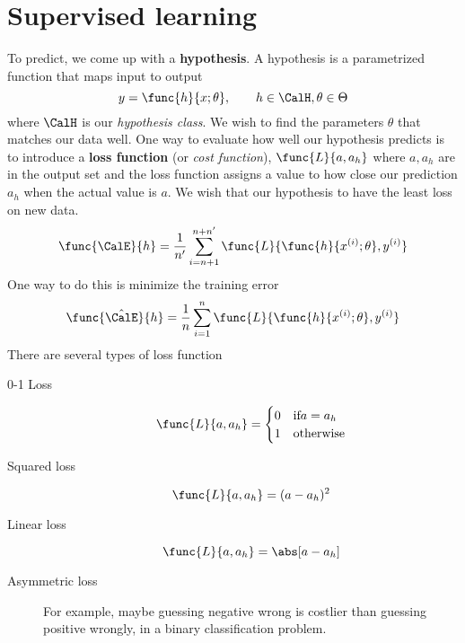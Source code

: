 \chapter{Supervised learning}
To predict, we come up with a \textbf{hypothesis}. A hypothesis is a parametrized function that maps input to output
\begin{equation*}
    y = \func{h}{x ; \theta} , \qquad h \in \CalH, \theta \in \Theta
\end{equation*}
where \(\CalH\) is our \textit{hypothesis class}. We wish to find the parameters \(\theta\) that matches our data well. One way to evaluate how well our hypothesis predicts is to introduce a \textbf{loss function} (or \textit{cost function}), \(\func{L}{a,a_h}\) where \(a,a_h\) are in the output set and the loss function assigns a value to how close our prediction \(a_h\) when the actual value is \(a\). We wish that our hypothesis to have the least loss on new data.
\begin{equation*}
    \func{\CalE}{h} = \dfrac{1}{n'} \sum_{i = n + 1}^{n + n'} \func{L}{\func{h}{x^{(i)} ; \theta }, y^{(i)}}
\end{equation*}
One way to do this is minimize the training error 
\begin{equation*}
    \func{\hat{\CalE}}{h} = \dfrac{1}{n} \sum_{i = 1}^n \func{L}{\func{h}{x^{(i)} ; \theta }, y^{(i)}}
\end{equation*}
There are several types of loss function
\begin{description}
    \item[0-1 Loss]
        \begin{equation*}
            \func{L}{a,a_h} = \begin{cases}
                0 & \text{if} a = a_h \\
                1 & \text{otherwise}
            \end{cases}
        \end{equation*}
    \item[Squared loss]
        \begin{equation*}
            \func{L}{a,a_h} = (a - a_h)^2
        \end{equation*}
    \item[Linear loss]
        \begin{equation*}
            \func{L}{a,a_h} = \abs[a - a_h]
        \end{equation*}
    \item[Asymmetric loss] For example, maybe guessing negative wrong is costlier than guessing positive wrongly, in a binary classification problem.
\end{description}
